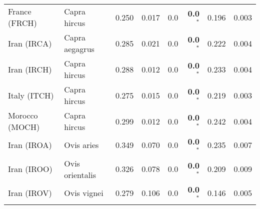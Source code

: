 \begin{center}
\begin{adjustbox}{width = 1\textwidth}
\begin{tabular}{|l|l|r|r|r|r|r|r|}
                  France (FRCH) &         Capra hircus &                                              0.250 &                                              0.017 &              0.0 &                    \textbf{0.0}$\bm{^*}$ &                                              0.196 &              0.003 \\
                    Iran (IRCA) &       Capra aegagrus &                                              0.285 &                                              0.021 &              0.0 &                    \textbf{0.0}$\bm{^*}$ &                                              0.222 &              0.004 \\
                    Iran (IRCH) &         Capra hircus &                                              0.288 &                                              0.012 &              0.0 &                    \textbf{0.0}$\bm{^*}$ &                                              0.233 &              0.004 \\
                   Italy (ITCH) &         Capra hircus &                                              0.275 &                                              0.015 &              0.0 &                    \textbf{0.0}$\bm{^*}$ &                                              0.219 &              0.003 \\
                 Morocco (MOCH) &         Capra hircus &                                              0.299 &                                              0.012 &              0.0 &                    \textbf{0.0}$\bm{^*}$ &                                              0.242 &              0.004 \\
                    Iran (IROA) &           Ovis aries &                                              0.349 &                                              0.070 &              0.0 &                    \textbf{0.0}$\bm{^*}$ &                                              0.235 &              0.007 \\
                    Iran (IROO) &      Ovis orientalis &                                              0.326 &                                              0.078 &              0.0 &                    \textbf{0.0}$\bm{^*}$ &                                              0.209 &              0.009 \\
                    Iran (IROV) &          Ovis vignei &                                              0.279 &                                              0.106 &              0.0 &                    \textbf{0.0}$\bm{^*}$ &                                              0.146 &              0.005 \\

\end{tabular}
\end{adjustbox}
\end{center}
